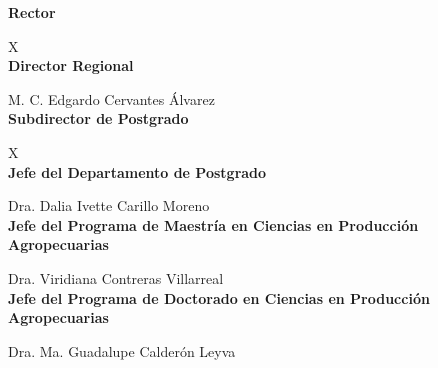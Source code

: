 
\vspace*{\fill}
\begin{center}
	\fontsize{13}{16}\selectfont
	
	\textbf{Rector}
	
	X\\[1.8cm]
	
	\textbf{Director Regional}
	
	M. C. Edgardo Cervantes Álvarez\\[1.8cm]
	
	\textbf{Subdirector de Postgrado}
	
	X\\[1.8cm]
	
	\textbf{Jefe del Departamento de Postgrado}
	
	Dra. Dalia Ivette Carillo Moreno\\[1.8cm]
	
	\textbf{Jefe del Programa de Maestría en Ciencias en Producción Agropecuarias}
	
	Dra. Viridiana Contreras Villarreal\\[1.8cm]
	
	\textbf{Jefe del Programa de Doctorado en Ciencias en Producción Agropecuarias}
	
	Dra. Ma. Guadalupe Calderón Leyva\\[1.8cm]
	
\end{center}
\vspace*{\fill}
\newpage


